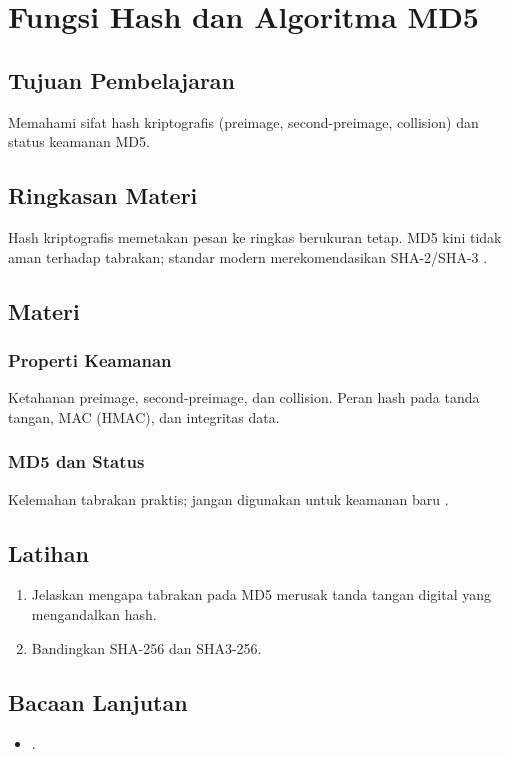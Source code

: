 \documentclass[../main.tex]{subfiles}
\begin{document}
\chapter{Fungsi Hash dan Algoritma MD5}
\section{Tujuan Pembelajaran}
Memahami sifat hash kriptografis (preimage, second-preimage, collision) dan status keamanan MD5.

\section{Ringkasan Materi}
Hash kriptografis memetakan pesan ke ringkas berukuran tetap. MD5 kini tidak aman terhadap tabrakan; standar modern merekomendasikan SHA-2/SHA-3 \citep{rfc6151,fips1804,fips202}.

\section{Materi}
\subsection{Properti Keamanan}
Ketahanan preimage, second-preimage, dan collision. Peran hash pada tanda tangan, MAC (HMAC), dan integritas data.

\subsection{MD5 dan Status}
Kelemahan tabrakan praktis; jangan digunakan untuk keamanan baru \citep{rfc6151}.

\section{Latihan}
\begin{enumerate}
  \item Jelaskan mengapa tabrakan pada MD5 merusak tanda tangan digital yang mengandalkan hash.
  \item Bandingkan SHA-256 dan SHA3-256.
\end{enumerate}

\section{Bacaan Lanjutan}
\begin{itemize}
  \item \citep{rfc6151,fips1804,fips202}.
\end{itemize}
\end{document}

